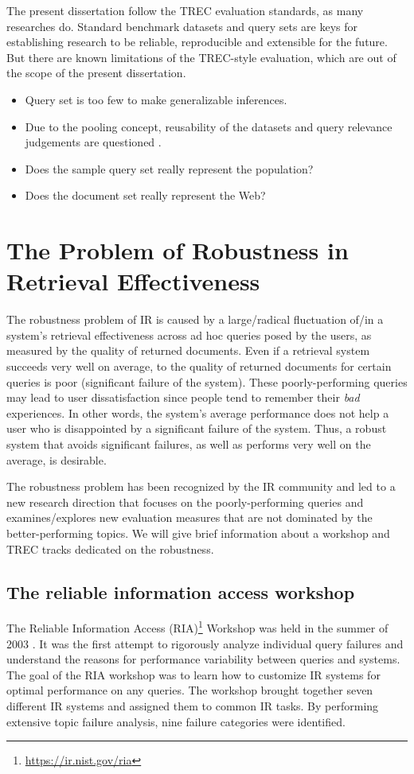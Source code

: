 The present dissertation follow the TREC evaluation standards, as many researches do.
Standard benchmark datasets and query sets are keys for establishing research to be reliable, reproducible and extensible for the future. 
But there are known limitations of the TREC-style evaluation, which are out of the scope of the present dissertation.

\begin{itemize}
  \item Query set is too few to make generalizable inferences.
  \item Due to the pooling concept, reusability of the datasets and query relevance judgements are questioned \citep{biasPool}.
  \item Does the sample query set really represent the population?
  \item Does the document set really represent the Web?
\end{itemize}

\section{The Problem of Robustness in Retrieval Effectiveness}
The robustness problem of IR is caused by a large/radical fluctuation of/in a system's retrieval effectiveness across ad hoc queries posed by the users, as measured by the quality of returned documents.
Even if a retrieval system succeeds very well on average, to the quality of returned documents for certain queries is poor (significant failure of the system).
These poorly-performing queries may lead to user dissatisfaction since people tend to remember their \emph{bad} experiences.
In other words, the system's average performance does not help a user who is disappointed by a significant failure of the system.
Thus, a robust system that avoids significant failures, as well as performs very well on the average, is desirable.

The robustness problem has been recognized by the IR community \citep[Chapter~1]{carmel2010estimating} and led to a new research direction
that focuses on the poorly-performing queries and examines/explores new evaluation measures that are not dominated by the better-performing topics.
We will give brief information about a workshop and TREC tracks dedicated on the robustness.

\subsection{The reliable information access workshop}
The Reliable Information Access (RIA)\footnote{\url{https://ir.nist.gov/ria}} Workshop was held in the summer of 2003 \citep{ria2}.
It was the first attempt to rigorously analyze individual query failures and understand the reasons for performance variability between queries and systems.
The goal of the RIA workshop was to learn how to customize IR systems for optimal performance on any queries.
The workshop brought together seven different IR systems and assigned them to common IR tasks. 
By performing extensive topic failure analysis, nine failure categories were identified.

